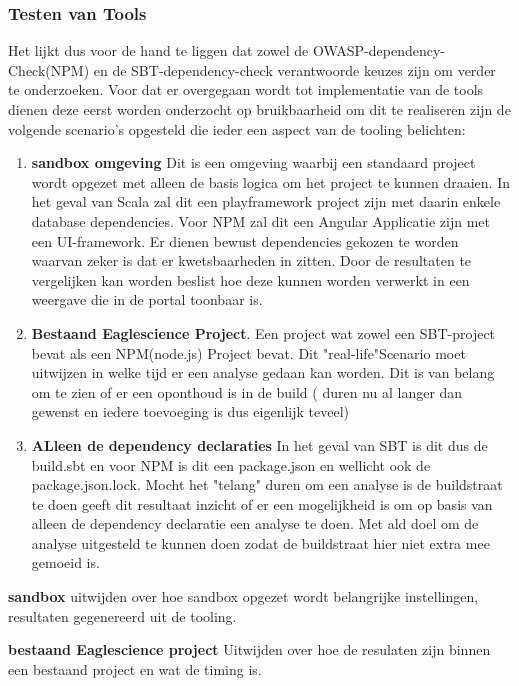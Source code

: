 \subsubsection{Testen van Tools}
Het lijkt dus voor de hand te liggen dat zowel de OWASP-dependency-Check(NPM) en de SBT-dependency-check verantwoorde keuzes zijn om verder te onderzoeken. Voor dat er overgegaan wordt tot implementatie van de tools dienen deze eerst worden onderzocht op bruikbaarheid om dit te realiseren zijn de volgende scenario's opgesteld die ieder een aspect van de tooling belichten:

\begin{enumerate}
    \item \textbf{sandbox omgeving} Dit is een omgeving waarbij een standaard project wordt opgezet met alleen de basis logica om het project te kunnen draaien. In het geval van Scala zal dit een playframework project zijn met daarin enkele database dependencies. Voor NPM zal dit een Angular Applicatie zijn met een UI-framework. Er dienen bewust dependencies gekozen te worden waarvan zeker is dat er kwetsbaarheden in zitten. Door de resultaten te vergelijken kan worden beslist hoe deze kunnen worden verwerkt in een weergave die in de portal toonbaar is.
    \item \textbf{Bestaand Eaglescience Project}. Een project wat zowel een SBT-project bevat als een NPM(node.js) Project bevat. Dit "real-life"Scenario moet uitwijzen in welke tijd er een analyse gedaan kan worden. Dit is van belang om te zien of er een oponthoud is in de build ( duren nu al langer dan gewenst en iedere toevoeging is dus eigenlijk teveel)
    \item \textbf{ALleen de dependency declaraties} In het geval van SBT is dit dus de build.sbt en voor NPM is dit  een package.json en wellicht ook de package.json.lock. Mocht het "telang" duren om een analyse is de buildstraat te doen geeft dit resultaat inzicht of er een mogelijkheid is om op basis van alleen de dependency declaratie een analyse te doen. Met ald doel om de analyse uitgesteld te kunnen doen zodat de buildstraat hier niet extra mee gemoeid is.
\end{enumerate}

\textbf{sandbox} uitwijden over hoe sandbox opgezet wordt belangrijke instellingen, resultaten gegenereerd uit de tooling.

\textbf{bestaand Eaglescience project} Uitwijden over hoe de resulaten zijn binnen een bestaand project en wat de timing is.

